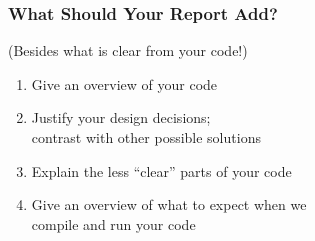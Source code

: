 \begin{frame}

\frametitle{What Should Your Report Add?}

(Besides what is clear from your code!)

\vspace{\fill}

\begin{enumerate}

\item Give an overview of your code

\item Justify your design decisions;\\ contrast with other possible
solutions

\item Explain the less ``clear'' parts of your code

\item Give an overview of what to expect when we\\ compile and run
your code

\end{enumerate}

\vspace{\fill}

\end{frame}


